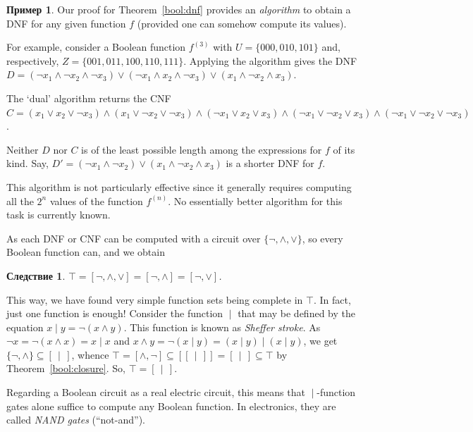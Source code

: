 \documentclass[12pt,notitlepage]{article}
\theoremstyle{plain}
\newtheorem{corr}[thm]{Следствие}
\theoremstyle{definition}
\newtheorem{exm}[thm]{Пример}
\theoremstyle{plain}
\newcommand{\sbs}{\subseteq}
\newcommand{\1}{\mathbf{1}}
\newcommand{\0}{\mathbf{0}}
\newcommand{\dvd}{\mathop{\mid}}
\begin{document}
\begin{exm}
	Our proof for Theorem~\ref{bool:dnf} provides an \emph{algorithm} to obtain a DNF for any given function $f$ (provided one can somehow compute its values).
	
	For example, consider a Boolean function $f^{(3)}$ with $U = \{ 000, 010, 101 \}$ and, respectively, $Z = \{ 001, 011, 100, 110, 111 \}$. Applying the algorithm gives the DNF $D = (\neg x_1 \wedge \neg x_2 \wedge \neg x_3) \vee (\neg x_1 \wedge x_2 \wedge \neg x_3) \vee (x_1 \wedge \neg x_2 \wedge x_3)$.
	
	The `dual' algorithm returns the CNF $C = (x_1 \vee x_2 \vee \neg x_3) \wedge (x_1 \vee \neg x_2 \vee \neg x_3) \wedge (\neg x_1 \vee x_2 \vee x_3) \wedge (\neg x_1 \vee \neg x_2 \vee x_3) \wedge (\neg x_1 \vee \neg x_2 \vee \neg x_3)$.
	
	Neither $D$ nor $C$ is of the least possible length among the expressions for $f$ of its kind. Say,  $D' = (\neg x_1 \wedge \neg x_2) \vee (x_1 \wedge \neg x_2 \wedge x_3)$ is a shorter DNF for $f$. 
	
	This algorithm is not particularly effective since it generally requires computing all the $2^n$ values of the function $f^{(n)}$. No essentially better algorithm for this task is currently known.
\end{exm}
As each DNF or CNF can be computed with a circuit over $\{{\neg}, {\wedge}, {\vee} \}$, so every Boolean function can, and we obtain
\begin{corr}\label{bool:dnf_compl}
	$\top = [{\neg}, {\wedge}, {\vee}] = [{\neg}, {\wedge}] = [{\neg}, {\vee}]$.
\end{corr}
This way, we have found very simple function sets being complete in $\top$. In fact, just one function is enough! Consider the function ${\dvd}$ that may be defined by the equation $x \dvd y = \neg (x \wedge y)$. This function is known as \emph{Sheffer stroke}. As $\neg x = \neg (x \wedge x) = x \dvd x$ and $x \wedge y = \neg (x \dvd y) = (x \dvd y) \dvd (x \dvd y)$, we get $\{{\neg}, {\wedge} \} \sbs [\,{\dvd}\, ]$, whence $\top = [{\wedge}, {\neg}] \sbs [[\,{\dvd}\,]] = [\,{\dvd}\,] \sbs \top$ by Theorem~\ref{bool:closure}. So, $\top = [\,{\dvd}\,]$.

Regarding a Boolean circuit as a real electric circuit, this means that ${\dvd}$-function gates alone suffice to compute any Boolean function. In electronics, they are called \emph{NAND gates} (``not-and'').
\end{document}
